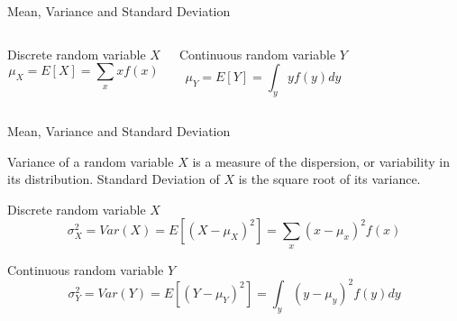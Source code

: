 \documentclass{beamer}\usepackage[]{graphicx}\usepackage[]{color}
\begin{document}
\begin{darkframes}
\begin{frame}[label=lists]{Mean, Variance and Standard Deviation}
		\begin{columns}[onlytextwidth]
        	Discrete random variable $X$
        	$$
				\mu_X = E[X] = \sum_x x f(x)	        	
        	$$
        	
        	Continuous random variable $Y$
        	$$
				\mu_Y = E[Y] = \int_y y f(y) dy	        	
        	$$
        	        
        \end{columns}


				
	\end{frame}





	\begin{frame}[label=lists]{Mean, Variance and Standard Deviation}
		
		\begin{definition}
			\alert{Variance} of a random variable $X$ is a measure of the dispersion, or variability in its distribution. \alert{Standard Deviation} of $X$ is the square root of its variance.
		\end{definition}
		
        	Discrete random variable $X$
        	$$
				\sigma^2_X = Var(X) = E[(X-\mu_X)^2] = \sum_x (x-\mu_x)^2 f(x)	        	
        	$$
        	
        	Continuous random variable $Y$
        	$$
				\sigma^2_Y = Var(Y) = E[(Y-\mu_Y)^2] = \int_y (y-\mu_y)^2 f(y)dy	        	
        	$$
   			
	\end{frame}




\end{darkframes}
  
  
  
\end{document}
